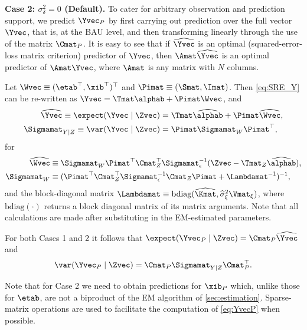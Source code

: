 {\bf Case 2: $\sigma^2_\delta = 0$ (Default).} To cater for arbitrary observation and prediction support, we predict $\Yvec_P$ by first carrying out prediction over the full vector $\Yvec$, that is, at the BAU level, and then transforming linearly through the use of the matrix $\Cmat_P$. It is easy to see that if $\widehat\Yvec$ is an optimal (squared-error-loss matrix criterion) predictor of $\Yvec$, then $\Amat\widehat\Yvec$ is an optimal predictor of $\Amat\Yvec$, where $\Amat$ is any matrix with $N$ columns.

Let $\Wvec \equiv (\etab^\top,\xib^\top)^\top$ and $\Pimat \equiv (\Smat,\Imat)$. Then \eqref{eq:SRE_Y} can be re-written as $\Yvec = \Tmat\alphab + \Pimat\Wvec$, and
\begin{align}
\widehat\Yvec \equiv \expect(\Yvec \mid \Zvec) &= \Tmat\widehat\alphab + \Pimat\widehat\Wvec, \nonumber \\
\Sigmamat_{Y \mid Z} \equiv \var(\Yvec \mid \Zvec) &= \Pimat \Sigmamat_W\Pimat^\top, \label{eq:Sigma_YZ}
\end{align}
for
\begin{align*}
\widehat\Wvec &\equiv \Sigmamat_W\Pimat^\top\Cmat_Z^\top\Sigmamat_\epsilon^{-1}(\Zvec - \Tmat_Z\widehat\alphab),\\%
\Sigmamat_W &\equiv (\Pimat^\top \Cmat_Z^\top \Sigmamat_\epsilon^{-1} \Cmat_Z \Pimat + \Lambdamat^{-1})^{-1},\\%
\end{align*}
and the block-diagonal matrix $\Lambdamat \equiv \textrm{bdiag}(\widehat\Kmat,\widehat\sigma^{2}_\xi\Vmat_{\xi})$, where $\textrm{bdiag}(\cdot)$ returns a block diagonal matrix of its matrix arguments. Note that all calculations are made after substituting in the EM-estimated parameters.

For both Cases 1 and 2 it follows that $\expect(\Yvec_P \mid \Zvec) = \Cmat_P\widehat\Yvec$ and
\begin{equation}\label{eq:YvecP}
\var(\Yvec_P \mid \Zvec) = \Cmat_P \Sigmamat_{Y \mid Z} \Cmat_P^\top.
\end{equation}

Note that for Case 2 we need to obtain predictions for $\xib_P$ which, unlike those for $\etab$, are not a biproduct of the EM algorithm of \ref{sec:estimation}. Sparse-matrix operations are used to facilitate the computation of \eqref{eq:YvecP} when possible.%

